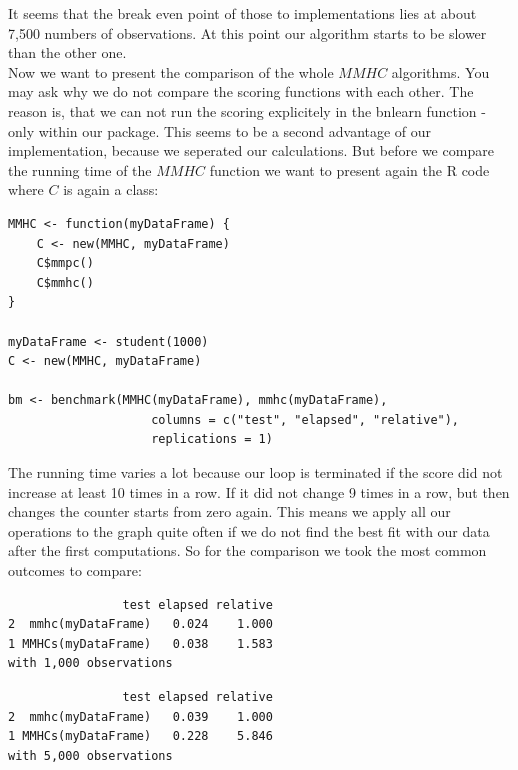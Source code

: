 
	It seems that the break even point of those to implementations lies at about 7,500 numbers of observations. At this point our algorithm starts to be slower than the other one.\\

	Now we want to present the comparison of the whole $MMHC$ algorithms. You may ask why we do not compare the scoring functions with each other. The reason is, that we can not run the scoring explicitely in the bnlearn function - only within our package. This seems to be a second advantage of our implementation, because we seperated our calculations. But before we compare the running time of the $MMHC$ function we want to present again the R code where $C$ is again a class:

 	\begin{verbatim}
MMHC <- function(myDataFrame) {
    C <- new(MMHC, myDataFrame)
    C$mmpc()
    C$mmhc()
}

myDataFrame <- student(1000)
C <- new(MMHC, myDataFrame)

bm <- benchmark(MMHC(myDataFrame), mmhc(myDataFrame),
                    columns = c("test", "elapsed", "relative"),
                    replications = 1)
 	\end{verbatim}

 	The running time varies a lot because our loop is terminated if the score did not increase at least 10 times in a row. If it did not change 9 times in a row, but then changes the counter starts from zero again. This means we apply all our operations to the graph quite often if we do not find the best fit with our data after the first computations. So for the comparison we took the most common outcomes to compare:

 	\begin{verbatim}
                test elapsed relative
2  mmhc(myDataFrame)   0.024    1.000
1 MMHCs(myDataFrame)   0.038    1.583
with 1,000 observations
 	\end{verbatim}

 	\begin{verbatim}
                test elapsed relative
2  mmhc(myDataFrame)   0.039    1.000
1 MMHCs(myDataFrame)   0.228    5.846
with 5,000 observations
 	\end{verbatim}

